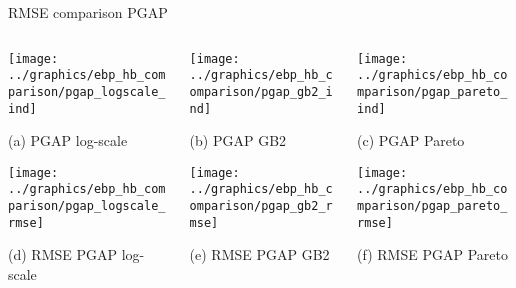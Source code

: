 \begin{frame}{RMSE comparison PGAP}
    \begin{columns}
        \begin{column}{0.32\textwidth}
            \centering

            \texttt{[image: ../graphics/ebp\_hb\_comparison/pgap\_logscale\_ind]}

            \scriptsize{(a) PGAP log-scale}

            \texttt{[image: ../graphics/ebp\_hb\_comparison/pgap\_logscale\_rmse]}

            \scriptsize{(d) RMSE PGAP log-scale}

        \end{column}



        \begin{column}{0.32\textwidth}
            \centering
            \texttt{[image: ../graphics/ebp\_hb\_comparison/pgap\_gb2\_ind]}

            \scriptsize{(b) PGAP GB2}

            \texttt{[image: ../graphics/ebp\_hb\_comparison/pgap\_gb2\_rmse]}

            \scriptsize{(e) RMSE PGAP GB2}
        \end{column}

        \begin{column}{0.32\textwidth}
            \centering
            \texttt{[image: ../graphics/ebp\_hb\_comparison/pgap\_pareto\_ind]}

            \scriptsize{(c) PGAP Pareto}

            \texttt{[image: ../graphics/ebp\_hb\_comparison/pgap\_pareto\_rmse]}

            \scriptsize{(f) RMSE PGAP Pareto}
        \end{column}
    \end{columns}
\end{frame}